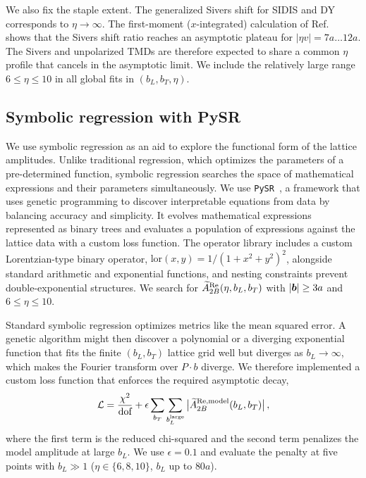 We also fix the staple extent. The generalized Sivers shift for SIDIS and DY corresponds to $\eta\to\infty$. The first-moment ($x$-integrated) calculation of Ref.~\cite{Musch:2011er} shows that the Sivers shift ratio reaches an asymptotic plateau for $|\eta v|=7a\ldots12a$. The Sivers and unpolarized TMDs are therefore expected to share a common $\eta$ profile that cancels in the asymptotic limit. We include the relatively large range $6\le\eta\le10$ in all global fits in $(b_L,b_T,\eta)$.

\subsection{Symbolic regression with PySR}
\label{sec:pysr}

We use symbolic regression as an aid to explore the functional form of the lattice amplitudes. Unlike traditional regression, which optimizes the parameters of a pre-determined function, symbolic regression searches the space of mathematical expressions and their parameters simultaneously. We use \texttt{PySR}~\cite{Cranmer2023pysr}, a framework that uses genetic programming to discover interpretable equations from data by balancing accuracy and simplicity. It evolves mathematical expressions represented as binary trees and evaluates a population of expressions against the lattice data with a custom loss function. The operator library includes a custom Lorentzian-type binary operator, $\text{lor}(x,y)=1/(1+x^2+y^2)^2$, alongside standard arithmetic and exponential functions, and nesting constraints prevent double-exponential structures. We search for $\widetilde{A}_{2B}^{\text{Re}}(\eta,b_L,b_T)$ with $|\boldsymbol{b}|\ge3a$ and $6\le\eta\le10$.

Standard symbolic regression optimizes metrics like the mean squared error. A genetic algorithm might then discover a polynomial or a diverging exponential function that fits the finite $(b_L,b_T)$ lattice grid well but diverges as $b_L\to\infty$, which makes the Fourier transform over $P\cdot b$ diverge. We therefore implemented a custom loss function that enforces the required asymptotic decay,
\begin{equation}
\mathcal L=\frac{\chi^2}{\text{dof}}+\epsilon\sum_{b_T}\sum_{b_L^{\text{large}}}\big|\widetilde{A}_{2B}^{\text{Re,model}}(b_L,b_T)\big|\,,
\label{eq:pysr_loss}
\end{equation}
where the first term is the reduced chi-squared and the second term penalizes the model amplitude at large $b_L$. We use $\epsilon=0.1$ and evaluate the penalty at five points with $b_L\gg1$ ($\eta\in\{6,8,10\}$, $b_L$ up to $80a$).

